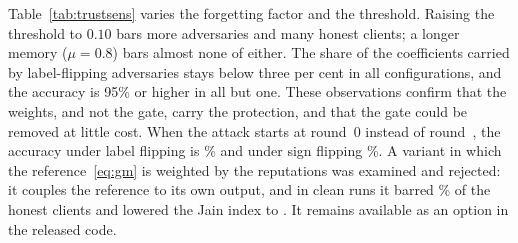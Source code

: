 Table~\ref{tab:trustsens} varies the forgetting factor and the threshold. Raising the threshold to $0.10$ bars more adversaries and many honest clients; a longer memory ($\mu=0.8$) bars almost none of either. The share of the coefficients carried by label-flipping adversaries stays below three per cent in all configurations, and the accuracy is 95\% or higher in all but one. These observations confirm that the weights, and not the gate, carry the protection, and that the gate could be removed at little cost. When the attack starts at round~0 instead of round~, the accuracy under label flipping is \% and under sign flipping \%. A variant in which the reference~\eqref{eq:gm} is weighted by the reputations was examined and rejected: it couples the reference to its own output, and in clean runs it barred \% of the honest clients and lowered the Jain index to . It remains available as an option in the released code.

